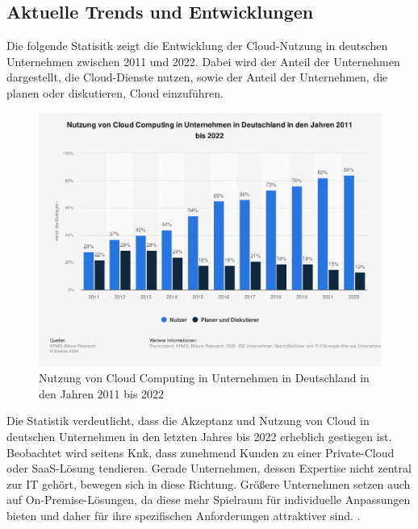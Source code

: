 \documentclass[12pt,bibtotoc]{article}
\begin{document}
			\subsection{Aktuelle Trends und Entwicklungen}\label{Aktuelle Trends und Entwicklungen}
			Die folgende Statisitk zeigt die Entwicklung der Cloud-Nutzung in deutschen Unternehmen zwischen 2011 und 2022.
			Dabei wird der Anteil der Unternehmen dargestellt, die Cloud-Dienste nutzen, sowie der Anteil der Unternehmen, die planen oder diskutieren, Cloud einzuführen. 
			\begin{figure}[H] %
				\centering
				\includegraphics[keepaspectratio,width=\textwidth,height=\textheight]{"Content/Pictures/Nutzung von Cloud Computing in Unternehmen in Deutschland in den Jahren 2011 bis 2022.png"} 
				\renewcommand{\figurename}{Abb.}
				\caption{\small Nutzung von Cloud Computing in Unternehmen in Deutschland in den Jahren 2011 bis 2022}
			\end{figure}
			Die Statistik verdeutlicht, dass die Akzeptanz und Nutzung von Cloud in deutschen Unternehmen in den letzten Jahres bis 2022 erheblich gestiegen ist. 
			Beobachtet wird seitens Knk, dass zunehmend Kunden zu einer Private-Cloud oder SaaS-Lösung tendieren. Gerade Unternehmen, dessen Expertise nicht zentral zur IT gehört, bewegen sich in diese Richtung.
			Größere Unternehmen setzen auch auf On-Premise-Lösungen, da diese mehr Spielraum für individuelle Anpassungen bieten und daher für ihre spezifischen Anforderungen attraktiver sind. \cite{Anhang}.
			\newpage
\end{document}
